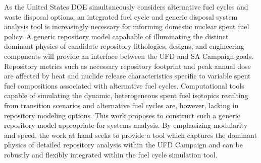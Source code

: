 As the United States \gls{DOE} simultaneously considers alternative fuel cycles 
and waste disposal options, an integrated fuel cycle and generic disposal system 
analysis tool is increasingly necessary for informing domestic nuclear spent 
fuel policy. A generic repository model capabable of illuminating the distinct 
dominant physics of candidate repository lithologies, designs, and engineering 
components will provide an interface between the \gls{UFD} and \gls{SA} Campaign 
goals. Repository metrics such as necessary repository footprint and peak annual 
dose are affected by heat and nuclide release characteristics specific to 
variable spent fuel compositions associated  with alternative fuel cycles. 
Computational tools capable of simulating the dynamic, heterogeneous spent fuel 
isotopics resulting from transition scenarios and alternative fuel cycles 
are, however, lacking in repository modeling  options. This work proposes to 
construct such a generic repository model appropriate for systems analysis. By 
emphasizing modularity and speed, the work at hand seeks to  provide a tool 
which captures the dominant physics of detailed repository analysis within the 
\gls{UFD} Campaign and can be robustly and flexibly integrated within the 
\Cyclus fuel cycle simulation tool.

\glsresetall
